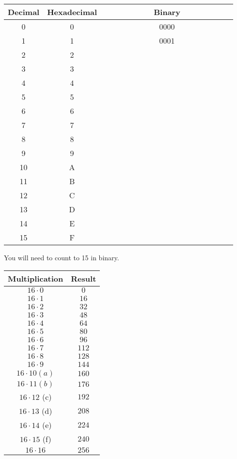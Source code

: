 \documentclass[letterpaper,12pt]{exam}
\begin{document}
\begin{center}
\begin{tabular}{| c | c | c |}
    \hline
        Decimal & Hexadecimal & \ \ \ \ \ \ \ \ \ \ \ Binary\ \ \ \ \ \ \ \ \ \ \ \\
        \hline
    0 & 0 & 0000 \\ 
    1 & 1 & 0001 \\  
\hline
    2 & 2 & \  \\ 
    3 & 3 & \  \\  
\hline
    4 & 4 & \  \\ 
    5 & 5 & \  \\  
\hline
    6 & 6 & \  \\ 
    7 & 7 & \  \\  
\hline
    8 & 8 & \  \\ 
    9 & 9 & \  \\  
\hline
    10 & A & \  \\ 
    11 & B & \  \\  
\hline
    12 & C & \  \\ 
    13 & D & \  \\  
\hline
    14 & E & \  \\ 
    15 & F & \  \\  
\hline
\end{tabular}
\par
You will need to count to 15 in binary.

\end{center}

\par
\begin{center}
\begin{tabular}{| c | c |}
 \hline
    Multiplication & Result \\
    \hline
 $16 \cdot 0 $ & $ 0 $ \\ 
 $16 \cdot 1 $ & $ 16 $ \\ 
\hline
 $16 \cdot 2 $ & $ 32 $ \\ 
 $16 \cdot 3 $ & $ 48 $ \\ 
\hline
 $16 \cdot 4 $ & $ 64 $ \\ 
 $16 \cdot 5 $ & $ 80 $ \\ 
\hline
 $16 \cdot 6 $ & $ 96 $ \\ 
 $16 \cdot 7 $ & $ 112 $ \\ 
\hline
 $16 \cdot 8 $ & $ 128 $ \\ 
 $16 \cdot 9 $ & $ 144 $ \\ 
\hline
$16 \cdot 10  (a)$ & $ 160 $ \\ 
$16 \cdot 11  (b) $ & $ 176 $ \\ 
\hline
$16 \cdot 12 $ (c) & $ 192 $ \\ 
$16 \cdot 13 $  (d) & $ 208 $ \\ 
\hline
$16 \cdot 14 $  (e)& $ 224 $ \\ 
$16 \cdot 15 $  (f) & $ 240 $ \\ 
\hline
 $16 \cdot 16 $ & $ 256 $ \\   
\hline
\end{tabular}
\end{center}
\end{document}

